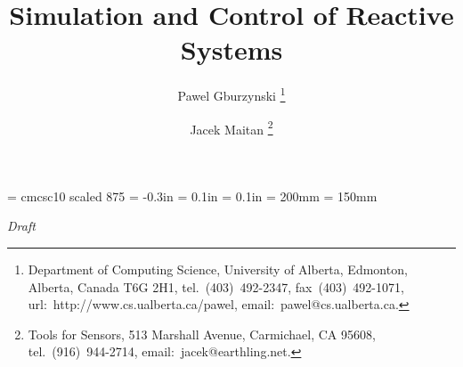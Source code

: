 
\newcommand{\fig}[1]{figure~\ref{fig.#1}}%
\newcommand{\Fig}[1]{Figure~\ref{fig.#1}}%
\newcommand{\tab}[1]{table~\ref{tab.#1}}%
\newcommand{\Tab}[1]{Table~\ref{tab.#1}}%
\newcommand{\sect}[1]{section~\ref{#1}}%
\newcommand{\Sect}[1]{Section~\ref{#1}}%
\newcommand{\defi}[1]{definition~\ref{#1}}%
\newcommand{\Defi}[1]{Definition~\ref{#1}}%
\newcommand{\chap}[1]{chapter~\ref{#1}}%
\newcommand{\Chap}[1]{Chapter~\ref{#1}}%
\newcommand{\appe}[1]{appendix~\ref{#1}}%
\newcommand{\Appe}[1]{Appendix~\ref{#1}}%

\newcommand{\references}[1]{%
}%

\newenvironment{doublespace}%
{\renewcommand{\baselinestretch}{1.50} \large \normalsize}%
{\renewcommand{\baselinestretch}{1} \large \normalsize}%

\newenvironment{singlespace}%
{\renewcommand{\baselinestretch}{1} \large \normalsize}%
{\renewcommand{\baselinestretch}{1.50} \large \normalsize}%

\font\ftsc = cmcsc10 scaled 875
\topmargin = -0.3in
\oddsidemargin = 0.1in
\evensidemargin = 0.1in
\textheight = 200mm
\textwidth = 150mm

\sloppy

\title
{Simulation and Control of Reactive Systems}

\author
{
Pawel Gburzynski%
\thanks {Department of Computing Science, University of Alberta,
Edmonton, Alberta, Canada T6G 2H1, tel.~(403)~492-2347, fax~(403)~492-1071,
url:~\mbox{http://www.cs.ualberta.ca/{}pawel},
email:~\mbox{pawel@cs.ualberta.ca.} }
\and
Jacek Maitan%
\thanks {Tools for Sensors,
513 Marshall Avenue,
Carmichael, CA 95608, tel.~(916)~944-2714,
email:~\mbox{jacek@earthling.net.} }
}

\date{}

\maketitle

\begin{center}
{\large {\em Draft}}
\end{center}

\bigskip

\bigskip

